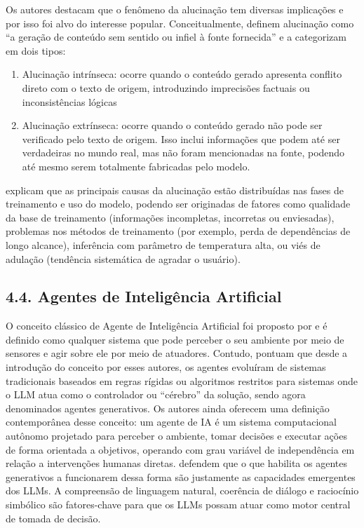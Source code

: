 \documentclass[12pt,oneside,a4paper,brazil,sumario=tradicional]{abntex2}
\begin{document}
Os autores destacam que o fenômeno da alucinação tem diversas implicações e por isso foi alvo do interesse popular. Conceitualmente, \textcite{ji2023} definem alucinação como “a geração de conteúdo sem sentido ou infiel à fonte fornecida” e a categorizam em dois tipos:

\begin{enumerate}
  \item Alucinação intrínseca: ocorre quando o conteúdo gerado apresenta conflito direto com o texto de origem, introduzindo imprecisões factuais ou inconsistências lógicas
  \item Alucinação extrínseca: ocorre quando o conteúdo gerado não pode ser verificado pelo texto de origem. Isso inclui informações que podem até ser verdadeiras no mundo real, mas não foram mencionadas na fonte, podendo até mesmo serem totalmente fabricadas pelo modelo.
\end{enumerate}
    \textcite{zhao2023} explicam que as principais causas da alucinação estão distribuídas nas fases de treinamento e uso do modelo, podendo ser originadas de fatores como qualidade da base de treinamento (informações incompletas, incorretas ou enviesadas), problemas nos métodos de treinamento (por exemplo, perda de dependências de longo alcance), inferência com parâmetro de temperatura alta, ou viés de adulação (tendência sistemática de agradar o usuário).

\subsection*{4.4. Agentes de Inteligência Artificial}
O conceito clássico de Agente de Inteligência Artificial foi proposto por \textcite{russell1995} e é definido como qualquer sistema que pode perceber o seu ambiente por meio de sensores e agir sobre ele por meio de atuadores. Contudo, \textcite{xi2023} pontuam que desde a introdução do conceito por esses autores, os agentes evoluíram de sistemas tradicionais baseados em regras rígidas ou algoritmos restritos para sistemas onde o LLM atua como o controlador ou “cérebro” da solução, sendo agora denominados agentes generativos. Os autores ainda oferecem uma definição contemporânea desse conceito: um agente de IA é um sistema computacional autônomo projetado para perceber o ambiente, tomar decisões e executar ações de forma orientada a objetivos, operando com grau variável de independência em relação a intervenções humanas diretas. \textcite{wang2023} defendem que o que habilita os agentes generativos a funcionarem dessa forma são justamente as capacidades emergentes dos LLMs. A compreensão de linguagem natural, coerência de diálogo e raciocínio simbólico são fatores-chave para que os LLMs possam atuar como motor central de tomada de decisão.
\end{document}
